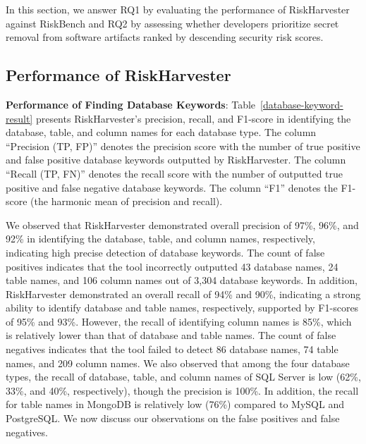 In this section, we answer RQ1 by evaluating the performance of RiskHarvester against RiskBench and RQ2 by assessing whether developers prioritize secret removal from software artifacts ranked by descending security risk scores.

\subsection{Performance of RiskHarvester} \label{RiskHarvesterResult}



\textbf{Performance of Finding Database Keywords}: Table~\ref{database-keyword-result} presents RiskHarvester's precision, recall, and F1-score in identifying the database, table, and column names for each database type. The column ``Precision (TP, FP)'' denotes the precision score with the number of true positive and false positive database keywords outputted by RiskHarvester. The column ``Recall (TP, FN)'' denotes the recall score with the number of outputted true positive and false negative database keywords. The column ``F1'' denotes the F1-score (the harmonic mean of precision and recall).


We observed that RiskHarvester demonstrated overall precision of 97\%, 96\%, and 92\% in identifying the database, table, and column names, respectively, indicating high precise detection of database keywords. The count of false positives indicates that the tool incorrectly outputted 43 database names, 24 table names, and 106 column names out of 3,304 database keywords. In addition, RiskHarvester demonstrated an overall recall of 94\% and 90\%, indicating a strong ability to identify database and table names, respectively, supported by F1-scores of 95\% and 93\%. However, the recall of identifying column names is 85\%, which is relatively lower than that of database and table names. The count of false negatives indicates that the tool failed to detect 86 database names, 74 table names, and 209 column names. We also observed that among the four database types, the recall of database, table, and column names of SQL Server is low (62\%, 33\%, and 40\%, respectively), though the precision is 100\%. In addition, the recall for table names in MongoDB is relatively low (76\%) compared to MySQL and PostgreSQL. We now discuss our observations on the false positives and false negatives.

